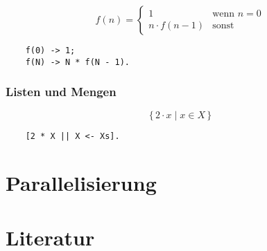 \documentclass[compress]{beamer}
\begin{document}
\begin{frame}[fragile]
  \frametitle{}
  $$
  f(n) =
  \begin{cases}
    1             &\textrm{wenn } n = 0 \\
    n \cdot f(n - 1) & \textrm{sonst}
  \end{cases}
  $$
  \vfill

  \begin{lstlisting}
    f(0) -> 1;
    f(N) -> N * f(N - 1).
  \end{lstlisting}
\end{frame}

\begin{frame}[fragile]
  \frametitle{Listen und Mengen}
  $$ \{\,2 \cdot x \mid x \in X\,\}$$

  \vfill

  \begin{lstlisting}
    [2 * X || X <- Xs].
  \end{lstlisting}
\end{frame}
\section{Parallelisierung}
\label{sec:parallelisierung}


\section{Literatur}
\label{sec:literatur}


\end{document}
